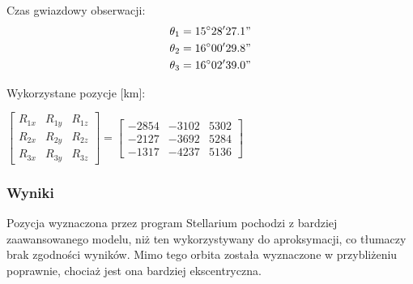     Czas gwiazdowy obserwacji: 
        \begin{align*}
            \theta_1 &= 15\degree 28'27.1" \\
            \theta_2 &= 16\degree 00'29.8"  \\
            \theta_3 &= 16\degree 02'39.0"
        \end{align*}

    Wykorzystane pozycje [km]: 
   
            \begin{center}
              $\begin{bmatrix}
                R_{1x} & R_{1y} & R_{1z} \\
                R_{2x} & R_{2y} & R_{2z} \\
                R_{3x} & R_{3y} & R_{3z} 
            \end{bmatrix}
            =
            \begin{bmatrix}
                -2854 & -3102 & 5302 \\
                -2127 & -3692 & 5284 \\
                -1317 & -4237 & 5136
            \end{bmatrix}    $
        \end{center}

    \subsubsection{Wyniki}
    
    Pozycja wyznaczona przez program Stellarium pochodzi z bardziej zaawansowanego modelu, niż ten wykorzystywany do aproksymacji, co tłumaczy brak zgodności wyników. Mimo tego orbita została wyznaczone w przybliżeniu poprawnie, chociaż jest ona bardziej ekscentryczna. 

